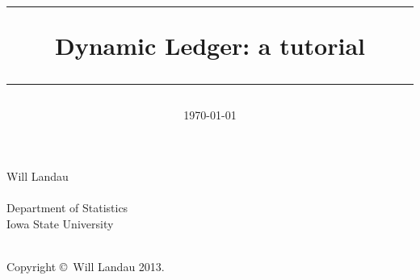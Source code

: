 \documentclass{article}
\title{\vspace{4cm} \hrule  \vspace{0.4cm} \huge
Dynamic Ledger: a tutorial
\vspace{0.4cm} \hrule}
\date{\today}
\begin{document}
\begin{titlepage}

\maketitle

\begin{center}
\vspace{1cm}
\Large
\begin{center}
Will Landau \\ $\quad$ \\
Department of Statistics \\
Iowa State University \\ $\quad$ \\
\end{center}

\vfill
\large
Copyright \copyright ~Will Landau 2013. 
\end{center}
\end{titlepage}

\newpage 
\pagestyle{fancy}
\setcounter{page}{1}
\tableofcontents 

\newpage
\setcounter{page}{1}
\end{document}

